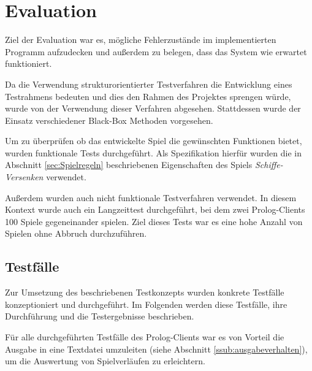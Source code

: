 \section{Evaluation} \label{sec:Evaluation}


	Ziel der Evaluation war es, mögliche Fehlerzustände im implementierten Programm aufzudecken und außerdem zu belegen, dass das System
	wie erwartet funktioniert. 
	
	Da die Verwendung strukturorientierter Testverfahren die Entwicklung eines Testrahmens bedeuten und dies den Rahmen des Projektes sprengen würde,
	wurde von der Verwendung dieser Verfahren abgesehen.  
	Stattdessen wurde der Einsatz verschiedener Black-Box Methoden vorgesehen.
	
	Um zu überprüfen ob das entwickelte Spiel die gewünschten Funktionen bietet, wurden funktionale Tests durchgeführt. 
	Als Spezifikation hierfür wurden die in Abschnitt \ref{sec:Spielregeln} beschriebenen Eigenschaften des Spiels \textit{Schiffe-Versenken}
	verwendet. 
	
	Außerdem wurden auch nicht funktionale Testverfahren verwendet. In diesem Kontext wurde auch ein Langzeittest durchgeführt, bei dem zwei
	Prolog-Clients 100 Spiele gegeneinander spielen. Ziel dieses Tests war es eine hohe Anzahl von Spielen ohne Abbruch durchzuführen. 	

\subsection{Testfälle}
	Zur Umsetzung des beschriebenen Testkonzepts %
	wurden konkrete Testfälle konzeptioniert und
	durchgeführt. Im Folgenden werden diese Testfälle, ihre Durchführung und die Testergebnisse beschrieben. 
	
	Für alle durchgeführten Testfälle des Prolog-Clients war es von Vorteil die Ausgabe in eine Textdatei umzuleiten (siehe Abschnitt \ref{ssub:ausgabeverhalten}), 
	um die Auswertung von Spielverläufen zu erleichtern.

